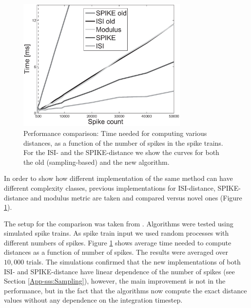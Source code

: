 \documentclass[10pt,twocolumn]{elsart5p}
\begin{document}
%
%
\begin{figure}
    \includegraphics[width=85mm]{Fig5_Performance_Comparison.eps}
    \caption{\abb\label{fig:Fig5-Performance-Comparison} Performance comparison: Time needed for computing various distances, as a function of the number of spikes in the spike trains. For the ISI- and the SPIKE-distance we show the curves for both the old (sampling-based) and the new algorithm.}
\end{figure}
%
%

In order to show how different implementation of the same method can have different complexity classes, previous implementations for ISI-distance, SPIKE-distance and modulus metric are taken and compared versus novel ones (Figure \ref{fig:Fig5-Performance-Comparison}).

The setup for the comparison was taken from \cite{Rusu14}. Algorithms were tested using simulated spike trains. As spike train input we used random processes with different numbers of spikes. Figure \ref{fig:Fig5-Performance-Comparison} shows average time needed to compute distances as a function of number of spikes. The results were averaged over $10,000$ trials. The simulations confirmed that the new 	implementations of both ISI- and SPIKE-distance have linear dependence of the number of spikes (see Section \ref{App-sss:Sampling}), however, the main improvement is not in the performance, but in the fact that the algorithms now compute the exact distance values without any dependence on the integration timestep.
\end{document}

